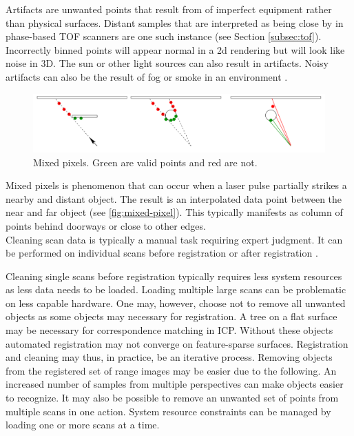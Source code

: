Artifacts are unwanted points that result from of imperfect equipment rather than physical surfaces. Distant samples that are interpreted as being close by in phase-based TOF scanners are one such instance (see Section \ref{subsec:tof}). Incorrectly binned points will appear normal in a 2d rendering but will look like noise in 3D. The sun or other light sources can also result in artifacts. Noisy artifacts can also be the result of fog or smoke in an environment \cite{Ruther2011}.


\begin{figure}[ht]
  \centering
  \includegraphics[width=1\linewidth]{images/mixed-pixel}
  \caption{Mixed pixels. Green are valid points and red are not. \cite{Tuley2005}}
  \label{fig:mixed-pixel}
\end{figure}

Mixed pixels is phenomenon that can occur when a laser pulse partially strikes a nearby and distant object. The result is an interpolated data point between the near and far object \cite{Tuley2005} (see \autoref{fig:mixed-pixel}). This typically manifests as column of points behind doorways or close to other edges. \\

Cleaning scan data is typically a manual task requiring expert judgment. It can be performed on individual scans before registration or after registration \cite{Ruther2011}.

Cleaning single scans before registration typically requires less system resources as less data needs to be loaded. Loading multiple large scans can be problematic on less capable hardware. One may, however, choose not to remove all unwanted objects as some objects may necessary for registration. A tree on a flat surface may be necessary for correspondence matching in ICP. Without these objects automated registration may not converge on feature-sparse surfaces. Registration and cleaning may thus, in practice, be an iterative process. Removing objects from the registered set of range images may be easier due to the following. An increased number of samples from multiple perspectives can make objects easier to recognize. It may also be possible to remove an unwanted set of points from multiple scans in one action. System resource constraints can be managed by loading one or more scans at a time.


